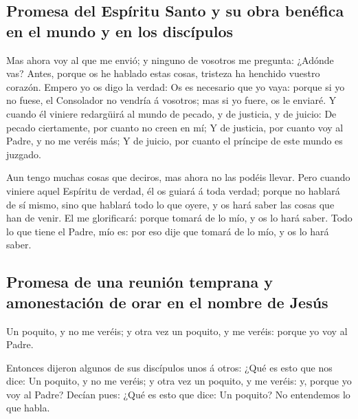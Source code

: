 \hypertarget{promesa-del-espuxedritu-santo-y-su-obra-benuxe9fica-en-el-mundo-y-en-los-discuxedpulos}{%
\subsection{Promesa del Espíritu Santo y su obra benéfica en el mundo y
en los
discípulos}\label{promesa-del-espuxedritu-santo-y-su-obra-benuxe9fica-en-el-mundo-y-en-los-discuxedpulos}}

 Mas ahora voy al que me envió; y ninguno de vosotros me
pregunta: ¿Adónde vas?  Antes, porque os he hablado estas
cosas, tristeza ha henchido vuestro corazón.  Empero yo os
digo la verdad: Os es necesario que yo vaya: porque si yo no fuese, el
Consolador no vendría á vosotros; mas si yo fuere, os le enviaré.
 Y cuando él viniere redargüirá al mundo de pecado, y de
justicia, y de juicio:  De pecado ciertamente, por cuanto no
creen en mí;  Y de justicia, por cuanto voy al Padre, y no
me veréis más;  Y de juicio, por cuanto el príncipe de este
mundo es juzgado.

 Aun tengo muchas cosas que deciros, mas ahora no las
podéis llevar.  Pero cuando viniere aquel Espíritu de
verdad, él os guiará á toda verdad; porque no hablará de sí mismo, sino
que hablará todo lo que oyere, y os hará saber las cosas que han de
venir.  El me glorificará: porque tomará de lo mío, y os lo
hará saber.  Todo lo que tiene el Padre, mío es: por eso
dije que tomará de lo mío, y os lo hará saber.

\hypertarget{promesa-de-una-reuniuxf3n-temprana-y-amonestaciuxf3n-de-orar-en-el-nombre-de-jesuxfas}{%
\subsection{Promesa de una reunión temprana y amonestación de orar en el
nombre de
Jesús}\label{promesa-de-una-reuniuxf3n-temprana-y-amonestaciuxf3n-de-orar-en-el-nombre-de-jesuxfas}}

 Un poquito, y no me veréis; y otra vez un poquito, y me
veréis: porque yo voy al Padre.

 Entonces dijeron algunos de sus discípulos unos á otros:
¿Qué es esto que nos dice: Un poquito, y no me veréis; y otra vez un
poquito, y me veréis: y, porque yo voy al Padre?  Decían
pues: ¿Qué es esto que dice: Un poquito? No entendemos lo que habla.

